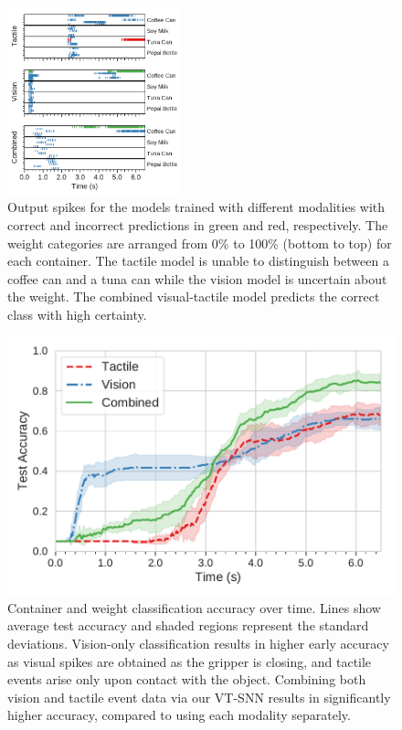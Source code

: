 \documentclass[fyp]{socreport}
\begin{document}
\begin{figure}
\centering
\includegraphics[width=0.45\textwidth]{images/analysis/spike_class_output.pdf}
\caption{Output spikes for the models trained with different modalities with
  correct and incorrect predictions in green and red, respectively. The weight
  categories are arranged from 0\% to 100\% (bottom to top) for each container.
  The tactile model is unable to distinguish between a coffee can and a tuna can
  while the vision model is uncertain about the weight. The combined
  visual-tactile model predicts the correct class with high certainty.}
\label{fig:spikeclass}
\end{figure}

\begin{figure}
  \centering
  \includegraphics[width=0.45\columnwidth]{images/analysis/object_det_over_time.pdf}
  \caption{Container and weight classification accuracy over time. Lines show
    average test accuracy and shaded regions represent the standard deviations.
    Vision-only classification results in higher early accuracy as visual spikes
    are obtained as the gripper is closing, and tactile events arise only upon
    contact with the object. Combining both vision and tactile event data via
    our VT-SNN results in significantly higher accuracy, compared to using each
    modality separately. }
\label{fig:classtime}
\end{figure}
\end{document}
